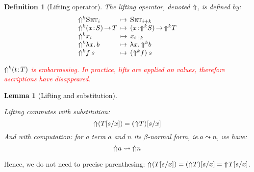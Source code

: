 \documentclass[preprint
              , authoryear
              , onecolumn
              ]{sigplanconf}
\newtheorem{definition}{Definition}
\newtheorem{lemma}{Lemma}
\newcommand{\note}[1]{\textcolor{red}{#1}}
\newcommand{\ie}{\emph{ie.}\xspace}
\begin{document}

\newcommand{\ECC}{ECCE\xspace}



\begin{definition}[Lifting operator]

The lifting operator, denoted $\SYMBUp$, is defined by:
$$
\begin{array}{l@{\:\:\mapsto\:\:}l}
\Up{k}{\Set{i}}                & \Set{i+k} \\
\Up{k}{\PI{\V{x}}{S}{T}}       & \PI{\V{x}}{\Up{k}{S}}{\Up{k}{T}} \\
\Up{k}{x_i}                    & x_{i+k} \\
\Up{k}{\LAM{x}{b}}             & \LAM{x}{\Up{k}{b}} \\
\Up{k}{f\: s}                  & (\Up{k}{f})\: s
\end{array}
$$

\note{$\Up{k}{(\Bhab{t}{T})}$ is embarrassing. In practice, lifts are
      applied on values, therefore ascriptions have disappeared.}

\end{definition}


\begin{lemma}[Lifting and substitution]
\label{lemma:up-bound-var}

Lifting commutes with substitution:
$$
\Up{}{(T[s/x])} = (\Up{}{T})[s/x]
$$
And with computation: for a term $a$ and $n$ its $\beta$-normal form,
\ie $a \leadsto n$, we have:
$$
\Up{}{a} \leadsto \Up{}{n}
$$


\end{lemma}

Hence, we do not need to precise parenthesing: $\Up{}{(T[s/x])} =
(\Up{}{T})[s/x] = \Up{}{T}[s/x]$.

\end{document}
